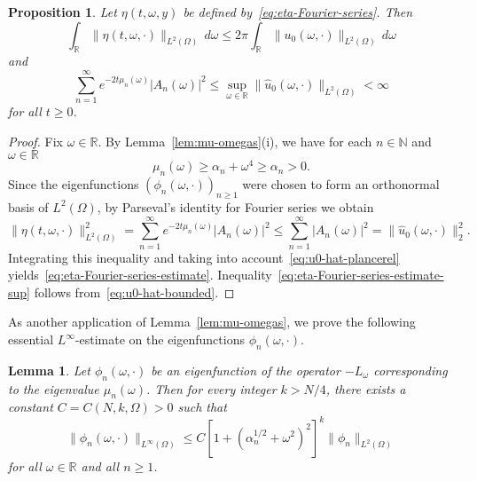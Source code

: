 \documentclass[a4paper, reqno]{amsart}
\numberwithin{equation}{section}
\theoremstyle{plain}
\newtheorem{proposition}[theorem]{Proposition}
\newtheorem{lemma}[theorem]{Lemma}
\theoremstyle{definition}
\theoremstyle{remark}
\newcommand{\NN}{\mathbb{N}}
\newcommand{\RR}{\mathbb{R}}
\begin{document}
\begin{proposition}
  \label{prop:eta-series}
  Let $\eta(t, \omega, y)$ be defined by~\eqref{eq:eta-Fourier-series}. Then
  \begin{equation}
    \label{eq:eta-Fourier-series-estimate}
    \int_\RR \| \eta(t, \omega, \cdot) \|_{L^2(\Omega)} \,d\omega
    \leq 2\pi\int_{\RR}\|u_0(\omega,\cdot)\|_{L^2(\Omega)}\,d\omega
  \end{equation}
  and
  \begin{equation}
    \label{eq:eta-Fourier-series-estimate-sup}
    \sum_{n=1}^\infty e^{-2t\mu_n(\omega)} |A_n(\omega)|^2
    \leq \sup_{\omega\in\RR}\|\widehat{u}_0(\omega,\cdot)\|_{L^2(\Omega)}<\infty
  \end{equation}
  for all $t\geq 0$.
\end{proposition}
\begin{proof}
  Fix $\omega \in \RR$. By Lemma~\ref{lem:mu-omegas}(i), we have for each $n \in \NN$ and $\omega\in\RR$
  \begin{equation*}
    \mu_n(\omega) \ge \alpha_n + \omega^4\geq \alpha_n>0.
  \end{equation*}
  Since the eigenfunctions $(\phi_n(\omega, \cdot))_{n \ge 1}$ were chosen to form an orthonormal basis of $L^2(\Omega)$, by Parseval's identity for Fourier series we obtain
  \begin{equation*}
    \label{eq:eta-series1}
    \| \eta(t, \omega, \cdot) \|_{L^2(\Omega)}^2
    =\sum_{n=1}^\infty e^{-2t\mu_n(\omega)} |A_n(\omega)|^2
    \leq\sum_{n=1}^\infty |A_n(\omega)|^2
    =\|\widehat{u}_0(\omega,\cdot)\|_2^2.
  \end{equation*}
  Integrating this inequality and taking into account~\eqref{eq:u0-hat-plancerel} yields~\eqref{eq:eta-Fourier-series-estimate}. Inequality~\eqref{eq:eta-Fourier-series-estimate-sup} follows from~\eqref{eq:u0-hat-bounded}.
\end{proof}

As another application of Lemma~\ref{lem:mu-omegas}, we prove the following essential $L^\infty$-estimate on the eigenfunctions $\phi_n(\omega,\cdot)$.
\begin{lemma}
  \label{lem:supnorm}
  Let $\phi_n(\omega, \cdot)$ be an eigenfunction of the operator $-L_\omega$ corresponding to the eigenvalue $\mu_n(\omega)$. Then for every integer $k>N/4$, there exists a constant $C = C(N, k, \Omega) > 0$ such that
  \begin{equation}
    \label{eq:supnorm}
    \| \phi_n(\omega, \cdot) \|_{L^\infty(\Omega)}
    \leq C \left[1+(\alpha_n^{1/2}+\omega^2)^2\right]^k\|\phi_n\|_{L^2(\Omega)}
  \end{equation}
  for all $\omega\in\RR$ and all $n \ge 1$.
\end{lemma}
\end{document}
